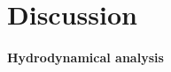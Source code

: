\section{Discussion}
\label{sec: discussion captive design optimization}

\paragraph{Hydrodynamical analysis}















